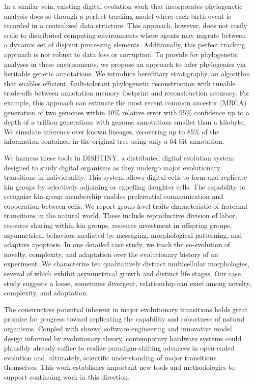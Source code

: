 In a similar vein, existing digital evolution work that incorporates phylogenetic analysis does so through a perfect tracking model where each birth event is recorded in a centralized data structure.
This approach, however, does not easily scale to distributed computing environments where agents may migrate between a dynamic set of disjoint processing elements.
Additionally, this perfect tracking approach is not robust to data loss or corruption.
To provide for phylogenetic analyses in these environments, we propose an approach to infer phylogenies via heritable genetic annotations.
We introduce hereditary stratigraphy, an algorithm that enables efficient, fault-tolerant phylogenetic reconstruction with tunable trade-offs between annotation memory footprint and reconstruction accuracy.
For example, this approach can estimate the most recent common ancestor (MRCA) generation of two genomes within 10\% relative error with 95\% confidence up to a depth of a trillion generations with genome annotations smaller than a kilobyte.
We simulate inference over known lineages, recovering up to 85\% of the information contained in the original tree using only a 64-bit annotation.

We harness these tools in DISHTINY, a distributed digital evolution system designed to study digital organisms as they undergo major evolutionary transitions in individuality.
This system allows digital cells to form and replicate kin groups by selectively adjoining or expelling daughter cells.
The capability to recognize kin-group membership enables preferential communication and cooperation between cells.
We report group-level traits characteristic of fraternal transitions in the natural world.
These include reproductive division of labor, resource sharing within kin groups, resource investment in offspring groups, asymmetrical behaviors mediated by messaging, morphological patterning, and adaptive apoptosis.
In one detailed case study, we track the co-evolution of novelty, complexity, and adaptation over the evolutionary history of an experiment.
We characterize ten qualitatively distinct multicellular morphologies, several of which exhibit asymmetrical growth and distinct life stages.
Our case study suggests a loose, sometimes divergent, relationship can exist among novelty, complexity, and adaptation.

The constructive potential inherent in major evolutionary transitions holds great promise for progress toward replicating the capability and robustness of natural organisms.
Coupled with shrewd software engineering and innovative model design informed by evolutionary theory, contemporary hardware systems could plausibly already suffice to realize paradigm-shifting advances in open-ended evolution and, ultimately, scientific understanding of major transitions themselves.
This work establishes important new tools and methodologies to support continuing work in this direction.
